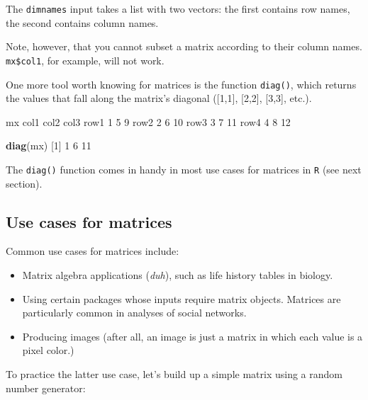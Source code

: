 \documentclass[]{book}
\newenvironment{Shaded}{\begin{snugshade}}{\end{snugshade}}
\newcommand{\DecValTok}[1]{\textcolor[rgb]{0.00,0.00,0.81}{#1}}
\newcommand{\KeywordTok}[1]{\textcolor[rgb]{0.13,0.29,0.53}{\textbf{#1}}}
\newcommand{\NormalTok}[1]{#1}
\begin{document}
The \texttt{dimnames} input takes a list with two vectors: the first contains row names, the second contains column names.

Note, however, that you cannot subset a matrix according to their column names. \texttt{mx\$col1}, for example, will not work.

One more tool worth knowing for matrices is the function \texttt{diag()}, which returns the values that fall along the matrix's diagonal ({[}1,1{]}, {[}2,2{]}, {[}3,3{]}, etc.).

\begin{Shaded}
\begin{Highlighting}[]
\NormalTok{mx}
\NormalTok{     col1 col2 col3}
\NormalTok{row1    }\DecValTok{1}    \DecValTok{5}    \DecValTok{9}
\NormalTok{row2    }\DecValTok{2}    \DecValTok{6}   \DecValTok{10}
\NormalTok{row3    }\DecValTok{3}    \DecValTok{7}   \DecValTok{11}
\NormalTok{row4    }\DecValTok{4}    \DecValTok{8}   \DecValTok{12}

\KeywordTok{diag}\NormalTok{(mx)}
\NormalTok{[}\DecValTok{1}\NormalTok{]  }\DecValTok{1}  \DecValTok{6} \DecValTok{11}
\end{Highlighting}
\end{Shaded}

The \texttt{diag()} function comes in handy in most use cases for matrices in \texttt{R} (see next section).

\hypertarget{use-cases-for-matrices}{%
\subsection*{Use cases for matrices}\label{use-cases-for-matrices}}

Common use cases for matrices include:

\begin{itemize}
\item
  Matrix algebra applications (\emph{duh}), such as life history tables in biology.
\item
  Using certain packages whose inputs require matrix objects. Matrices are particularly common in analyses of social networks.
\item
  Producing images (after all, an image is just a matrix in which each value is a pixel color.)
\end{itemize}

To practice the latter use case, let's build up a simple matrix using a random number generator:
\end{document}
